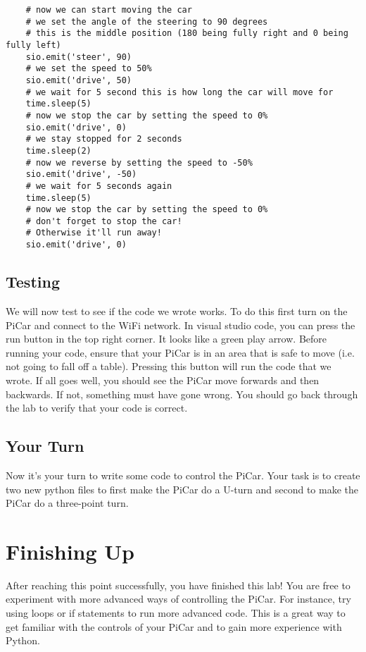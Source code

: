 \documentclass[11pt]{report}
\begin{document}
\begin{verbatim}
    # now we can start moving the car
    # we set the angle of the steering to 90 degrees
    # this is the middle position (180 being fully right and 0 being fully left)
    sio.emit('steer', 90)
    # we set the speed to 50%
    sio.emit('drive', 50)
    # we wait for 5 second this is how long the car will move for
    time.sleep(5)
    # now we stop the car by setting the speed to 0%
    sio.emit('drive', 0)
    # we stay stopped for 2 seconds
    time.sleep(2)
    # now we reverse by setting the speed to -50%
    sio.emit('drive', -50)
    # we wait for 5 seconds again
    time.sleep(5)
    # now we stop the car by setting the speed to 0%
    # don't forget to stop the car!
    # Otherwise it'll run away!
    sio.emit('drive', 0)
    \end{verbatim}

\section{Testing}
We will now test to see if the code we wrote works. To do this first turn on the PiCar and connect to the WiFi network. In visual studio code, you can press the run button in the top right corner. It looks like a green play arrow. Before running your code, ensure that your PiCar is in an area that is safe to move (i.e. not going to fall off a table). Pressing this button will run the code that we wrote. If all goes well, you should see the PiCar move forwards and then backwards. If not, something must have gone wrong. You should go back through the lab to verify that your code is correct.

\section{Your Turn}

Now it's your turn to write some code to control the PiCar. Your task is to create two new python files to first make the PiCar do a U-turn and second to make the PiCar do a three-point turn.

\chapter{Finishing Up}
After reaching this point successfully, you have finished this lab! You are free to experiment with more advanced ways of controlling the PiCar. For instance, try using loops or if statements to run more advanced code. This is a great way to get familiar with the controls of your PiCar and to gain more experience with Python.
\end{document}

